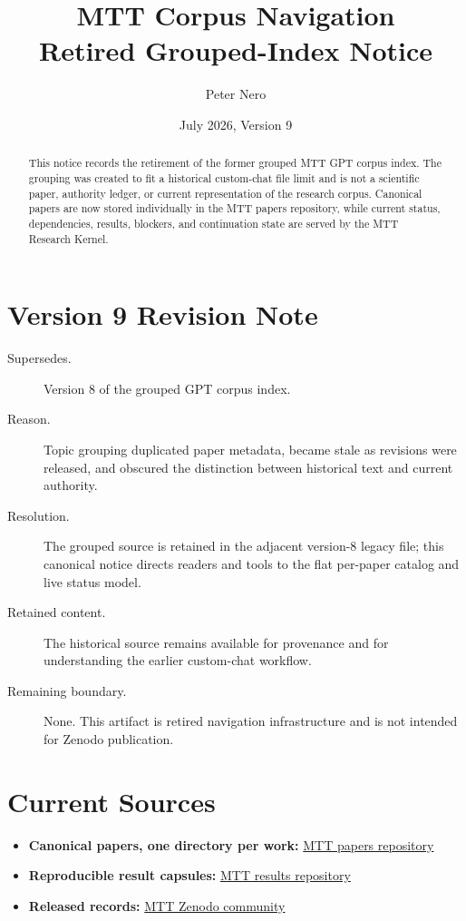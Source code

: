 \documentclass[11pt]{article}
\title{MTT Corpus Navigation\\Retired Grouped-Index Notice}
\author{Peter Nero}
\date{July 2026, Version 9}
\begin{document}
\maketitle

\begin{abstract}
This notice records the retirement of the former grouped MTT GPT corpus index. The grouping
was created to fit a historical custom-chat file limit and is not a scientific paper,
authority ledger, or current representation of the research corpus. Canonical papers are now
stored individually in the MTT papers repository, while current status, dependencies,
results, blockers, and continuation state are served by the MTT Research Kernel.
\end{abstract}

\section*{Version 9 Revision Note}
\begin{description}
\item[Supersedes.] Version 8 of the grouped GPT corpus index.
\item[Reason.] Topic grouping duplicated paper metadata, became stale as revisions were
released, and obscured the distinction between historical text and current authority.
\item[Resolution.] The grouped source is retained in the adjacent version-8 legacy file;
this canonical notice directs readers and tools to the flat per-paper catalog and live
status model.
\item[Retained content.] The historical source remains available for provenance and for
understanding the earlier custom-chat workflow.
\item[Remaining boundary.] None. This artifact is retired navigation infrastructure and is
not intended for Zenodo publication.
\end{description}

\section{Current Sources}

\begin{itemize}[leftmargin=*]
\item \textbf{Canonical papers, one directory per work:}
\href{https://github.com/PeterNero/mtt-papers}{MTT papers repository}
\item \textbf{Reproducible result capsules:}
\href{https://github.com/PeterNero/mtt-results-repro}{MTT results repository}
\item \textbf{Released records:}
\href{https://zenodo.org/communities/mtt/}{MTT Zenodo community}
\end{itemize}
\end{document}
